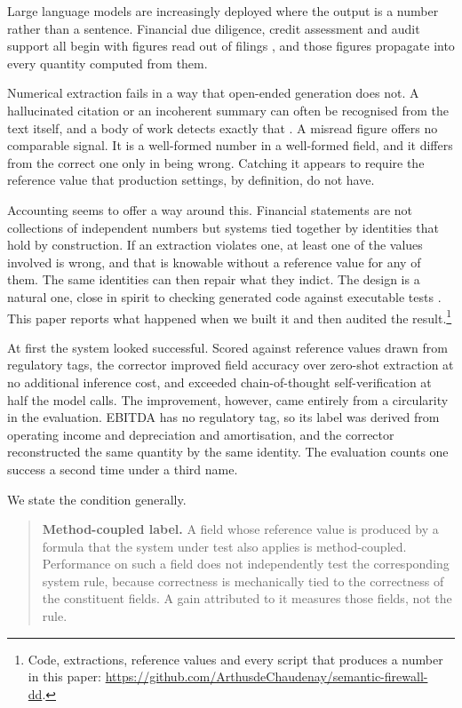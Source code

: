 \documentclass[11pt]{article}
\begin{document}
Large language models are increasingly deployed where the output is a number rather than
a sentence. Financial due diligence, credit assessment and audit support all begin with
figures read out of filings \citep{wu2023bloomberggpt,10.1145/3768292.3770387}, and those
figures propagate into every quantity computed from them.

Numerical extraction fails in a way that open-ended generation does not. A hallucinated
citation or an incoherent summary can often be recognised from the text itself, and a
body of work detects exactly that \citep{ji2023survey,manakul2023selfcheckgpt}. A misread
figure offers no comparable signal. It is a well-formed number in a well-formed field,
and it differs from the correct one only in being wrong. Catching it appears to require
the reference value that production settings, by definition, do not have.

Accounting seems to offer a way around this. Financial statements are not collections of
independent numbers but systems tied together by identities that hold by construction.
If an extraction violates one, at least one of the values involved is wrong, and that is
knowable without a reference value for any of them. The same identities can then
repair what they indict. The design is a natural one, close in spirit to checking generated code against
executable tests \citep{chen2023codet}. This paper reports what happened when we built
it and then audited the result.\footnote{Code, extractions, reference values and every
script that produces a number in this paper:
\url{https://github.com/ArthusdeChaudenay/semantic-firewall-dd}.}

At first the system looked successful. Scored against reference values drawn from
regulatory tags, the corrector improved field accuracy over zero-shot extraction at no
additional inference cost, and exceeded chain-of-thought self-verification at half the
model calls. The improvement, however, came entirely from a circularity in the
evaluation. EBITDA has no regulatory tag, so its label was derived from operating income
and depreciation and amortisation, and the corrector reconstructed the same quantity by
the same identity. The evaluation counts one success a second time under a third name.

We state the condition generally.

\begin{samepage}
\begin{quote}
\textbf{Method-coupled label.} A field whose reference value is produced by a formula
that the system under test also applies is method-coupled. Performance on such a field
does not independently test the corresponding system rule, because correctness is mechanically
tied to the correctness of the constituent fields. A gain attributed to it measures
those fields, not the rule.
\end{quote}
\end{samepage}
\end{document}
